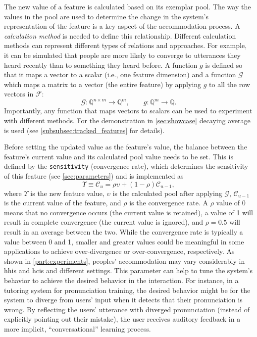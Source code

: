 The new value of a feature is calculated based on its exemplar pool.
The way the values in the pool are used to determine the change in the system's representation of the feature is a key aspect of the accommodation process.
A \textit{calculation method} is needed to define this relationship.
Different calculation methods can represent different types of relations and approaches.
For example, it can be simulated that people are more likely to converge to utterances they heard recently than to something they heard before.
A function $g$ is defined so that it maps a vector to a scalar (i.e., one feature dimension) and a function $\mathcal{G}$ which maps a matrix to a vector (the entire feature) by applying $g$ to all the row vectors in $\mathcal{F}$:
%
\begin{equation}
	\label{eq:matrix2vec}
	\mathcal{G}: \mathbb{Q}^{n \times m} \longrightarrow \mathbb{Q}^{m}, \qquad g: \mathbb{Q}^{m} \longrightarrow \mathbb{Q}.
\end{equation}
%
\noindent
Importantly, any function that maps vectors to scalars can be used to experiment with different methods.
For the demonstration in \cref{sec:showcase} decaying average is used (see \cref{subsubsec:tracked_features} for details).

Before setting the updated value as the feature's value, the balance between the feature's current value and its calculated pool value needs to be set.
This is defined by the \texttt{sensitivity} (convergence rate), which determines the sensitivity of this feature (see \cref{sec:parameters}) and is implemented as
%
\begin{equation}
	\Upsilon \equiv \mathcal{C}_u = \rho \upsilon + \left(1 - \rho \right) \mathcal{C}_{u-1},
	\label{eq:convergence_rate}
\end{equation}
\noindent
%
where $\Upsilon$ is the new feature value, $\upsilon$ is the calculated pool after applying $\mathcal{G}$, $\mathcal{C}_{u-1}$ is the current value of the feature, and $\rho$ is the convergence rate.
A $\rho$ value of 0 means that no convergence occurs (the current value is retained), a value of 1 will result in complete convergence (the current value is ignored), and $\rho=0.5$ will result in an average between the two.
While the convergence rate is typically a value between 0 and 1, smaller and greater values could be meaningful in some applications to achieve over-divergence or over-convergence, respectively.
As shown in \cref{part:experiments}, peoples' accommodation may vary considerably in \acp{hhi} and \acp{hci} and different settings.
This parameter can help to tune the system's behavior to achieve the desired behavior in the interaction.
For instance, in a tutoring system for pronunciation training, the desired behavior might be for the system to diverge from users' input when it detects that their pronunciation is wrong.
By reflecting the users' utterance with diverged pronunciation (instead of explicitly pointing out their mistake), the user receives auditory feedback in a more implicit, \enquote{conversational} learning process.

